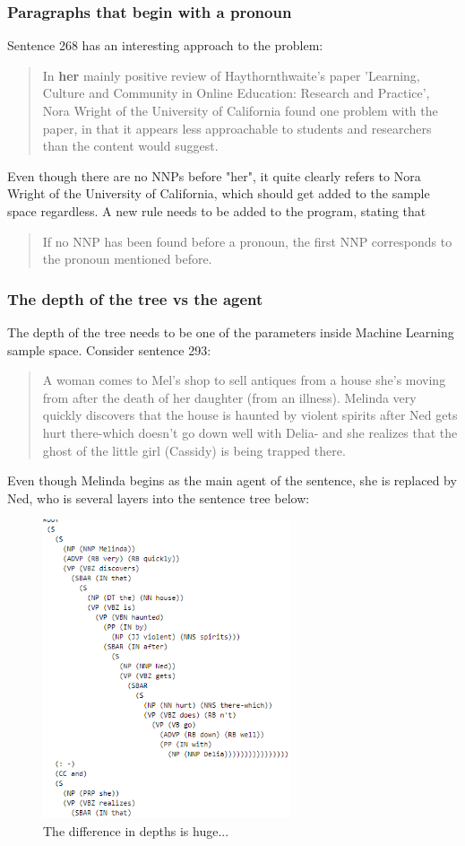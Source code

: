 \documentclass{article}
\begin{document}
\subsubsection{Paragraphs that begin with a pronoun}
Sentence 268 has an interesting approach to the problem:
\begin{quote}
    In \textbf{her} mainly positive review of Haythornthwaite's paper 'Learning, Culture and Community in Online Education: Research and Practice', Nora Wright of the University of California found one problem with the paper, in that it appears less approachable to students and researchers than the content would suggest.
\end{quote}
Even though there are no NNPs before "her", it quite clearly refers to Nora Wright of the University of California, which should get added to the sample space regardless. A new rule needs to be added to the program, stating that
\begin{quote}
    If no NNP has been found before a pronoun, the first NNP corresponds to the pronoun mentioned before.
\end{quote}

\subsubsection{The depth of the tree vs the agent}
The depth of the tree needs to be one of the parameters inside Machine Learning sample space. Consider sentence 293:
\begin{quote}
    A woman comes to Mel's shop to sell antiques from a house she's moving from after the death of her daughter (from an illness). Melinda very quickly discovers that the house is haunted by violent spirits after Ned gets hurt there-which doesn't go down well with Delia- and she realizes that the ghost of the little girl (Cassidy) is being trapped there.	
\end{quote}
Even though Melinda begins as the main agent of the sentence, she is replaced by Ned, who is several layers into the sentence tree below:
\begin{figure}[h!]
    \centering
\includegraphics[width=0.65\textwidth]{Example10.png}
    \caption{The difference in depths is huge...}
\end{figure}
\end{document}
